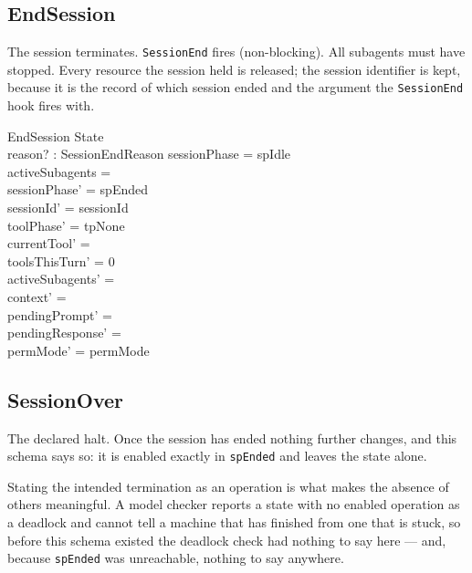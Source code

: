 \documentclass[a4paper,10pt,fleqn]{article}
\begin{document}
\subsection{EndSession}

The session terminates. \texttt{SessionEnd} fires (non-blocking).
All subagents must have stopped. Every resource the session held is
released; the session identifier is kept, because it is the record of
which session ended and the argument the \texttt{SessionEnd} hook fires
with.

\begin{schema}{EndSession}
  \Delta State \\
  reason? : SessionEndReason
  \where
  sessionPhase = spIdle \\
  activeSubagents = \emptyset \\
  sessionPhase' = spEnded \\
  sessionId' = sessionId \\
  toolPhase' = tpNone \\
  currentTool' = \emptyset \\
  toolsThisTurn' = 0 \\
  activeSubagents' = \emptyset \\
  context' = \langle \rangle \\
  pendingPrompt' = \emptyset \\
  pendingResponse' = \emptyset \\
  permMode' = permMode
\end{schema}

\subsection{SessionOver}

The declared halt. Once the session has ended nothing further changes,
and this schema says so: it is enabled exactly in \texttt{spEnded} and
leaves the state alone.

Stating the intended termination as an operation is what makes the
absence of others meaningful. A model checker reports a state with no
enabled operation as a deadlock and cannot tell a machine that has
finished from one that is stuck, so before this schema existed the
deadlock check had nothing to say here --- and, because \texttt{spEnded}
was unreachable, nothing to say anywhere.
\end{document}
